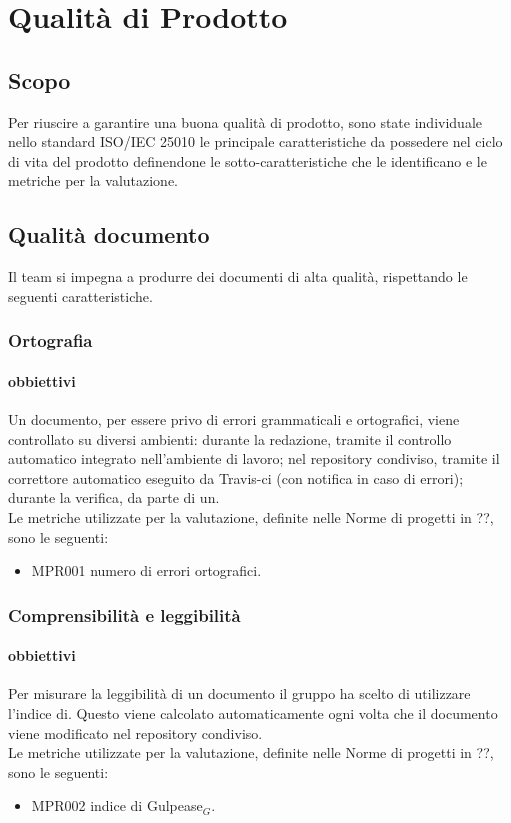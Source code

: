 \chapter{Qualità di Prodotto}
\label{prodotto}
\section{Scopo}
Per riuscire a garantire una buona qualità di prodotto, sono state individuale nello
standard ISO/IEC 25010 le principale caratteristiche da possedere nel ciclo di vita del prodotto definendone le sotto-caratteristiche che le identificano e le metriche per la valutazione.

\section{Qualità documento}
\label{documento}
Il team si impegna a produrre dei documenti di alta qualità, rispettando le seguenti caratteristiche.
\subsection{Ortografia}
\subsubsection{obbiettivi}
Un documento, per essere privo di errori grammaticali e ortografici, viene controllato su diversi ambienti: durante la redazione, tramite il controllo automatico integrato nell'ambiente di lavoro; nel repository condiviso, tramite il correttore automatico eseguito da Travis-ci (con notifica in caso di errori); durante la verifica, da parte di un.\\
Le metriche utilizzate per la valutazione, definite nelle Norme di progetti in ??, sono le seguenti:
\begin{itemize}
    \item MPR001 numero di errori ortografici.
\end{itemize}
\subsection{Comprensibilità e leggibilità}
\subsubsection{obbiettivi}
Per misurare la leggibilità di un documento il gruppo ha scelto di utilizzare l'indice di. Questo viene calcolato automaticamente ogni volta che il documento viene modificato nel repository condiviso.\\
Le metriche utilizzate per la valutazione, definite nelle Norme di progetti in ??, sono le seguenti:
\begin{itemize}
    \item MPR002 indice di Gulpease$_{G}$.
\end{itemize}
